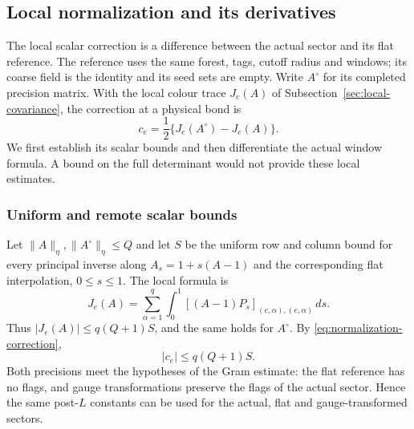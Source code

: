 \subsection{Local normalization and its derivatives}
\label{sec:normalization-jets}
The local scalar correction is a difference between the actual sector
and its flat reference. The reference uses the same forest, tags,
cutoff radius and windows; its coarse field is the identity and its
seed sets are empty. Write $A^\circ$ for its completed precision
matrix. With the local colour trace $J_e(A)$ of
Subsection~\ref{sec:local-covariance}, the correction at a physical bond is
\begin{equation}\label{eq:normalization-correction}
 c_e=\frac12\{J_e(A^\circ)-J_e(A)\}.
\end{equation}
We first establish its scalar bounds and then differentiate the actual
window formula. A bound on the full determinant would not provide
these local estimates.

\subsubsection{Uniform and remote scalar bounds}
Let $\|A\|_\eta,\|A^\circ\|_\eta\le Q$ and let $S$ be the
uniform row and column bound for every principal inverse along
$A_s=1+s(A-1)$ and the corresponding flat interpolation, $0\le s\le1$.
The local formula is
\[
 J_e(A)=\sum_{\alpha=1}^q\int_0^1
       [(A-1)P_s]_{(e,\alpha),(e,\alpha)}\,ds.
\]
Thus $|J_e(A)|\le q(Q+1)S$, and the same holds for $A^\circ$.
By \eqref{eq:normalization-correction},
\begin{equation}\label{eq:normalization-uniform}
 |c_e|\le q(Q+1)S.
\end{equation}
Both precisions meet the hypotheses of the Gram estimate: the flat
reference has no flags, and gauge transformations preserve the flags
of the actual sector. Hence the same post-$L$ constants can be used
for the actual, flat and gauge-transformed sectors.

